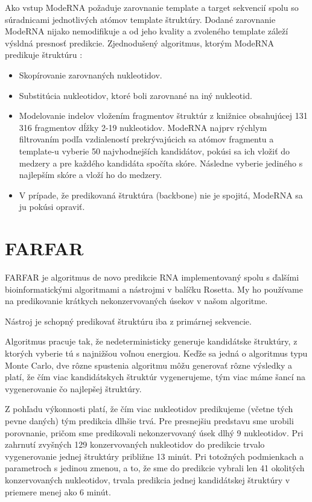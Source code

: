 \indent Ako vstup ModeRNA požaduje zarovnanie  template a target sekvencií spolu so súradnicami jednotlivých atómov template štruktúry. Dodané zarovnanie ModeRNA nijako nemodifikuje a od jeho kvality a zvoleného template záleží výsldná presnosť predikcie. 
Zjednodušený algoritmus, ktorým ModeRNA predikuje štruktúru \cite{Rother11}: 

\begin{itemize}
\item Skopírovanie zarovnaných nukleotidov.
\item Substitúcia nukleotidov, ktoré boli zarovnané na iný nukleotid.
\item Modelovanie indelov vložením fragmentov štruktúr z knižnice obsahujúcej 131 316 fragmentov dĺžky 2-19 nukleotidov. ModeRNA najprv rýchlym filtrovaním podľa vzdialeností  prekrývajúcich sa atómov fragmentu a template-u vyberie 50 najvhodnejších kandidátov, pokúsi sa ich vložiť do medzery a pre každého kandidáta spočíta skóre. Následne vyberie jediného s najlepším skóre a vloží ho do medzery.
\item V prípade, že predikovaná štruktúra (backbone) nie je spojitá, ModeRNA sa ju pokúsi opraviť.
\end{itemize}


\section{FARFAR}

FARFAR je algoritmus de novo predikcie RNA implementovaný spolu s ďalšími bioinformatickými algoritmami a nástrojmi v balíčku Rosetta. My ho používame na predikovanie krátkych nekonzervovaných úsekov v našom algoritme.  


\indent Nástroj je schopný predikovať štruktúru iba z primárnej sekvencie. 


\indent Algoritmus pracuje tak, že nedeterministicky generuje kandidátske štruktúry, z ktorých vyberie tú s najnižšou voľnou energiou. Keďže sa jedná o algoritmus typu Monte Carlo, dve rôzne spustenia algoritmu môžu generovať rôzne výsledky a platí, že čím viac kandidátskych štruktúr vygenerujeme, tým viac máme šancí na vygenerovanie čo najlepšej štruktúry.


\indent Z pohľadu výkonnosti platí, že čím viac nukleotidov predikujeme (včetne tých pevne daných) tým predikcia dlhšie trvá. Pre presnejšiu predstavu sme urobili porovnanie, pričom sme predikovali nekonzervovaný úsek dlhý 9 nukleotidov. Pri zahrnutí zvyšných 129 konzervovaných nukleotidov do predikcie trvalo vygenerovanie jednej štruktúry približne 13 minút. Pri totožných podmienkach a parametroch s jedinou zmenou, a to, že sme do predikcie vybrali len 41 okolitých konzervovaných nukleotidov, trvala predikcia jednej kandidátskej štruktúry v priemere menej ako 6 minút.



